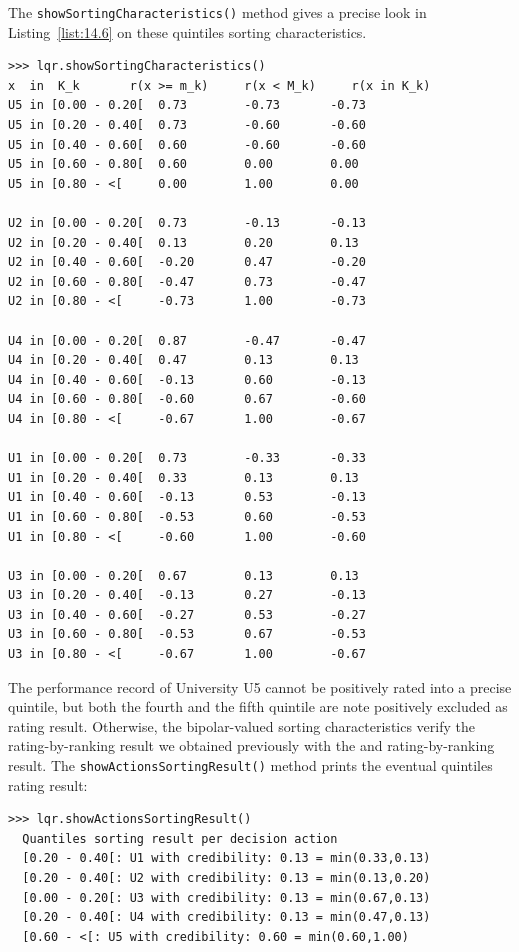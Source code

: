 The \texttt{showSortingCharacteristics()} method gives a precise look in Listing~\vref{list:14.6} on these quintiles sorting characteristics.
\begin{lstlisting}[caption={Showing quantiles sorting characteristics},label=list:14.6,basicstyle=\ttfamily\scriptsize]
>>> lqr.showSortingCharacteristics()
x  in  K_k	     r(x >= m_k)     r(x < M_k)	    r(x in K_k)
U5 in [0.00 - 0.20[	 0.73		 -0.73		 -0.73
U5 in [0.20 - 0.40[	 0.73		 -0.60		 -0.60
U5 in [0.40 - 0.60[	 0.60		 -0.60		 -0.60
U5 in [0.60 - 0.80[	 0.60		 0.00		 0.00
U5 in [0.80 - <[	 0.00		 1.00		 0.00

U2 in [0.00 - 0.20[	 0.73		 -0.13		 -0.13
U2 in [0.20 - 0.40[	 0.13		 0.20		 0.13
U2 in [0.40 - 0.60[	 -0.20		 0.47		 -0.20
U2 in [0.60 - 0.80[	 -0.47		 0.73		 -0.47
U2 in [0.80 - <[	 -0.73		 1.00		 -0.73

U4 in [0.00 - 0.20[	 0.87		 -0.47		 -0.47
U4 in [0.20 - 0.40[	 0.47		 0.13		 0.13
U4 in [0.40 - 0.60[	 -0.13		 0.60		 -0.13
U4 in [0.60 - 0.80[	 -0.60		 0.67		 -0.60
U4 in [0.80 - <[	 -0.67		 1.00		 -0.67

U1 in [0.00 - 0.20[	 0.73		 -0.33		 -0.33
U1 in [0.20 - 0.40[	 0.33		 0.13		 0.13
U1 in [0.40 - 0.60[	 -0.13		 0.53		 -0.13
U1 in [0.60 - 0.80[	 -0.53		 0.60		 -0.53
U1 in [0.80 - <[	 -0.60		 1.00		 -0.60

U3 in [0.00 - 0.20[	 0.67		 0.13		 0.13
U3 in [0.20 - 0.40[	 -0.13		 0.27		 -0.13
U3 in [0.40 - 0.60[	 -0.27		 0.53		 -0.27
U3 in [0.60 - 0.80[	 -0.53		 0.67		 -0.53
U3 in [0.80 - <[	 -0.67		 1.00		 -0.67
\end{lstlisting}

The performance record of University U5 cannot be positively rated into a precise quintile, but both the fourth and the fifth quintile are note positively excluded as rating result. Otherwise, the bipolar-valued sorting characteristics verify the rating-by-ranking result we obtained previously with the \Kemeny and \Copeland rating-by-ranking result. 
The \texttt{showActionsSortingResult()} method prints the eventual quintiles rating result:
\begin{lstlisting}[caption={Showing a quintiles rating-by-sorting result},label=list:14.7]
>>> lqr.showActionsSortingResult()
  Quantiles sorting result per decision action
  [0.20 - 0.40[: U1 with credibility: 0.13 = min(0.33,0.13)
  [0.20 - 0.40[: U2 with credibility: 0.13 = min(0.13,0.20)
  [0.00 - 0.20[: U3 with credibility: 0.13 = min(0.67,0.13)
  [0.20 - 0.40[: U4 with credibility: 0.13 = min(0.47,0.13)
  [0.60 - <[: U5 with credibility: 0.60 = min(0.60,1.00)
\end{lstlisting}

